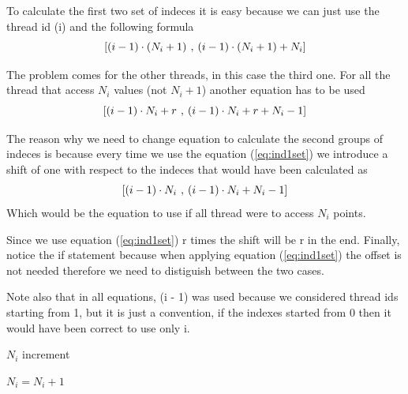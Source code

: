 \documentclass{report}
\begin{document}
\begin{minipage}[b]{0.48\textwidth}
    To calculate the first two set of indeces it is easy because we can just use the thread id (i) and the following formula
    \begin{equation}\label{eq:ind1set}
      \mathbf{[}(i - 1) \cdot (N_i + 1) \hspace{0.05in}\mathbf{,}\hspace{0.05in} (i - 1) \cdot (N_i + 1) + N_i\mathbf{]}
    \end{equation}

    The problem comes for the other threads, in this case the third one. For all the thread that access $N_i$ values (not $N_i + 1$) another equation has to be used
    \begin{equation*}
      \mathbf{[}(i - 1) \cdot N_i + r \hspace{0.05in}\mathbf{,}\hspace{0.05in} (i - 1) \cdot N_i + r + N_i - 1\mathbf{]}
    \end{equation*}

    The reason why we need to change equation to calculate the second groups of indeces is because every time we use the equation (\ref{eq:ind1set}) we introduce a shift of one with respect to the indeces that would have been calculated as
    \begin{equation*}
      \mathbf{[}(i - 1) \cdot N_i \hspace{0.05in}\mathbf{,}\hspace{0.05in} (i - 1) \cdot N_i + N_i - 1\mathbf{]}
    \end{equation*}
    Which would be the equation to use if all thread were to access $N_i$ points.

    Since we use equation (\ref{eq:ind1set}) r times the shift will be r in the end. 
    Finally, notice the if statement because when applying equation (\ref{eq:ind1set}) the offset is not needed therefore we need to distiguish between the two cases.

    Note also that in all equations, (i - 1) was used because we considered thread ids starting from 1, but it is just a convention, if the indexes started from 0 then it would have been correct to use only i.

    \begin{algorithm}[H]
      \caption{$N_i$ increment}
      \begin{algorithmic}
          \State $N_i = N_i + 1$
        \EndIf
      \end{algorithmic}
    \end{algorithm}
  \end{minipage}
\end{document}
